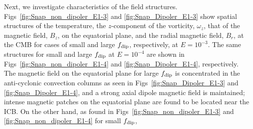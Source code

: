 {\color{blue}
Next, we investigate characteristics of the field structures.
Figs~\ref{fig:Snap_non_dipoler_E1-3} and \ref{fig:Snap_Dipoler_E1-3} show spatial structures of the temperature, the $z$-component of the vorticity, $\omega_z$, that of the magnetic field, $B_z$, on the equatorial plane, and the radial magnetic field, $B_r$, at the CMB for cases of small and large $f_{\rm dip}$, respectively, at $E = 10^{-3}$.
The same structures for small and large $f_{\rm dip}$ at $E = 10^{-4}$ are shown in Figs~\ref{fig:Snap_non_dipoler_E1-4} and \ref{fig:Snap_Dipoler_E1-4}, respectively.
}
{\color{blue}
The magnetic field on the equatorial plane for large $f_{\rm dip}$ is concentrated in the anti-cyclonic convection columns as seen in Figs~\ref{fig:Snap_Dipoler_E1-3} and \ref{fig:Snap_Dipoler_E1-4}, and a strong axial dipole magnetic field is maintained; intense magnetic patches on the equatorial plane are found to be located near the ICB.
%
On the other hand, as found in Figs~\ref{fig:Snap_non_dipoler_E1-3} and \ref{fig:Snap_non_dipoler_E1-4} for small $f_{\rm dip}$,
}
